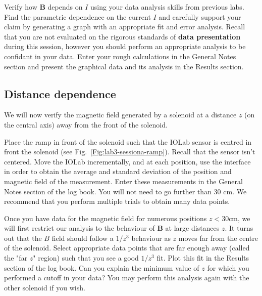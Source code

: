 \documentclass[12pt]{report}
\begin{document}
{\color{blue}Verify how $\mathbf{B}$ depends on $I$ using your data analysis skills from previous labs. Find the parametric dependence on the current $I$ and carefully support your claim by generating a graph with an appropriate fit and error analysis.
Recall that you are not evaluated on the rigorous standards of \textbf{data presentation} during this session, however you should perform an appropriate analysis to be confidant in your data. Enter your rough calculations in the General Notes section and present the graphical data and its analysis in the Results section. }

\subsection{Distance dependence}
We will now verify the magnetic field generated by a solenoid at a distance $z$ (on the central axis) away from the front of the solenoid.

Place the ramp in front of the solenoid such that the IOLab sensor is centred in front the solenoid (see Fig.~\ref{Fig:lab3-sessiona-ramp}). 
Recall that the sensor isn't centered. Move the IOLab incrementally, and {\color{blue}at each position, use the interface in order to obtain the average and standard deviation of the position and magnetic field of the measurement. Enter these measurements in the General Notes section of the log book.}
You will not need to go further than 30 cm. We recommend that you perform multiple trials to obtain many data points.

Once you have data for the magnetic field for numerous positions $z<30$cm, we will first restrict our analysis to the behaviour of $\mathbf{B}$ at large distances $z$. It turns out that the $B$ field should follow a $1/z^3$ behaviour as $z$ moves far from the centre of the solenoid. 
{\color{blue}Select appropriate data points that are far enough away (called the "far $z$" region) such that you see a good $1/z^3$ fit. Plot this fit in the Results section of the log book. Can you explain the minimum value of $z$ for which you performed a cutoff in your data?} You may perform this analysis again with the other solenoid if you wish.



\end{document}
